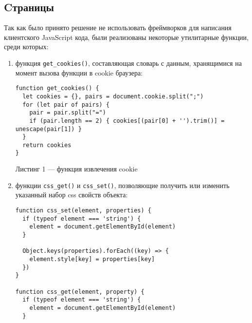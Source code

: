 \documentclass[14pt]{extarticle}
\begin{document}
\subsection{Cтраницы}
Так как было принято решение не использовать фреймворков для написания клиентского JavaScript кода, были реализованы некоторые утилитарные функции, среди которых:
\begin{enumerate}
\item[] функция \texttt{get\_cookies()}, составляющая словарь с данным, хранящимися на момент вызова функции в cookie браузера:
\begin{lstlisting}
function get_cookies() {
  let cookies = {}, pairs = document.cookie.split(";")
  for (let pair of pairs) {
    pair = pair.split("=")
    if (pair.length == 2) { cookies[(pair[0] + '').trim()] = unescape(pair[1]) }
  }
  return cookies
}
\end{lstlisting}
\begin{center}
Листинг 1 --- функция извлечения cookie
\end{center}
\item[] функции \texttt{css\_get()} и \texttt{css\_set()}, позволяющие получить или изменить указанный набор css свойств объекта:
\begin{lstlisting}
function css_set(element, properties) {
  if (typeof element === 'string') {
    element = document.getElementById(element)
  }

  Object.keys(properties).forEach((key) => {
    element.style[key] = properties[key]
  })
}

function css_get(element, property) {
  if (typeof element === 'string') {
    element = document.getElementById(element)
  }


\end{lstlisting}
\end{enumerate}
\end{document}
